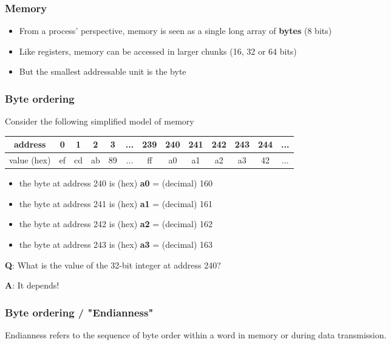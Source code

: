 \documentclass[12pt]{article}
\begin{document}
\subsubsection{Memory}

\begin{itemize}
    \item From a process' perspective, memory is seen as a single long array of \textbf{bytes} (8 bits)
    \item Like registers, memory can be accessed in larger chunks (16, 32 or 64 bits)
    \item But the smallest addressable unit is the byte
\end{itemize}

\subsubsection{Byte ordering}
Consider the following simplified model of memory\\
\begin{tabular}{c c c c c c c c c c c c c}
    \hline
    address & 0 & 1 & 2 & 3 & ... & 239 & 240 & 241 & 242 & 243 & 244 & ... \\
    \hline
    value (hex) & ef & cd & ab & 89 & ... & ff & a0 & a1 & a2 & a3 & 42 & ... \\
    \hline
\end{tabular}

\begin{itemize}
    \item the byte at address 240 is (hex) \textbf{a0} = (decimal) 160
    \item the byte at address 241 is (hex) \textbf{a1} = (decimal) 161
    \item the byte at address 242 is (hex) \textbf{a2} = (decimal) 162
    \item the byte at address 243 is (hex) \textbf{a3} = (decimal) 163
\end{itemize}

\textbf{Q}: What is the value of the 32-bit integer at address 240?

\textbf{A}: It depends!

\subsubsection{Byte ordering / "Endianness"}
Endianness refers to the sequence of byte order within a word in memory or during data transmission.\\
\end{document}
